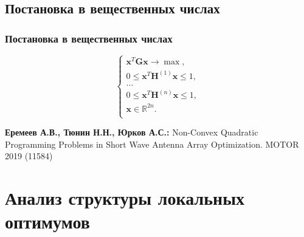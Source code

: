 \subsection{Постановка в вещественных числах}
\begin{frame}
    \frametitle{Постановка в вещественных числах}

    \begin{equation}
        \begin{cases}
           \textbf{x}^{T}\textbf{Gx} \rightarrow \max,\\
           0 \leq \textbf{x}^{T}\textbf{H}^{(1)}\textbf{x} \leq 1,\\
           ...\\
           0 \leq \textbf{x}^{T}\textbf{H}^{(n)}\textbf{x} \leq 1,\\
          \textbf{x} \in \mathbb{R}^{2n}.\\
         \end{cases}
         \label{eq:task3}
    \end{equation}
    
    
\vspace{8em}


\footnotesize { \textbf{Еремеев А.В., Тюнин Н.Н., Юрков А.С.:} Non-Convex Quadratic Programming Problems in Short Wave Antenna Array Optimization. MOTOR 2019 (11584) }
\end{frame}

\section{Анализ структуры локальных оптимумов}

